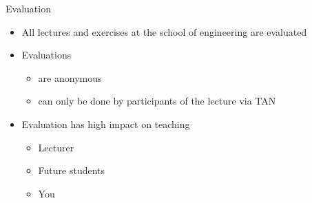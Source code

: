 \begin{frame}{Evaluation}
	\begin{itemize}
		\setlength\itemsep{0.3cm}
		\item All lectures and exercises at the school of engineering are evaluated
		\item Evaluations
		      \begin{itemize}
			      \item are anonymous
			      \item can only be done by participants of the lecture via TAN
		      \end{itemize}
		\item Evaluation has high impact on teaching
		      \begin{itemize}
			      \item Lecturer
			      \item Future students
			      \item You
		      \end{itemize}
	\end{itemize}
\end{frame}

